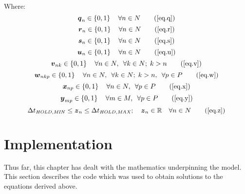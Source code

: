 Where:
\begin{equation}
    \boldsymbol{q}_{n} \in \left\{0, 1\right\} \quad \forall n \in N
    \tag{\ref{eq.q}}
\end{equation}
\begin{equation}
    \boldsymbol{r}_{n} \in \left\{ 0, 1 \right\} \quad \forall n \in N
    \tag{\ref{eq.r}}
\end{equation}
\begin{equation}
    \boldsymbol{s}_{n} \in \left\{ 0, 1 \right\} \quad \forall n \in N
    \tag{\ref{eq.s}}
\end{equation} 
\begin{equation}
    \boldsymbol{u}_{n} \in \left\{ 0, 1 \right\} \quad \forall n \in N
    \tag{\ref{eq.u}}
\end{equation}
\begin{equation}
    \boldsymbol{v}_{nk} \in \left\{ 0, 1 \right\} \quad \forall n \in N,
    \enspace \forall k \in N; \; k > n
    \tag{\ref{eq.v}}
\end{equation}
\begin{equation}
    \boldsymbol{w}_{nkp} \in \left\{ 0, 1 \right\} \quad \forall n \in N, 
    \enspace \forall k \in N; \; k > n, \enspace \forall p \in P
    \tag{\ref{eq.w}}
\end{equation}
\begin{equation}
    \boldsymbol{x}_{np} \in \left\{ 0, 1 \right\} \quad \forall n \in N,
    \enspace \forall p \in P
    \tag{\ref{eq.x}}
\end{equation}
\begin{equation}
    \boldsymbol{y}_{mp} \in \left\{ 0, 1 \right\} \quad \forall m \in M,
    \enspace \forall p \in P
    \tag{\ref{eq.y}}
\end{equation}
\begin{equation}
    \Delta t_{\mathit{HOLD,MIN}} \le \boldsymbol{z}_{n} \le 
    \Delta t_{\mathit{HOLD,MAX}}; \quad
    \boldsymbol{z}_{n} \in \mathbb{R} \quad \forall n \in N
    \tag{\ref{eq.z}}
\end{equation}

\section{Implementation}\label{S.implementation}

Thus far, this chapter has dealt with the mathematics underpinning the model.
This section describes the code which was used to obtain solutions to the
equations derived above.

